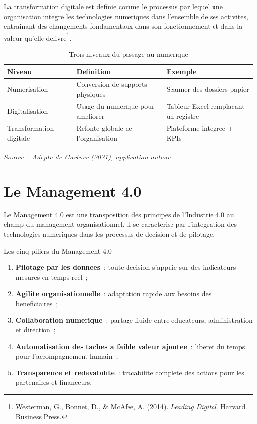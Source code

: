 \documentclass[12pt,a4paper,openany]{report}
\begin{document}
La transformation digitale est definie comme le processus par lequel
une organisation integre les technologies numeriques dans l'ensemble
de ses activites, entrainant des changements fondamentaux dans son
fonctionnement et dans la valeur qu'elle delivre\footnote{Westerman,
G., Bonnet, D., \& McAfee, A. (2014). \textit{Leading Digital}.
Harvard Business Press.}.

\begin{table}[H]
\centering
\caption{Trois niveaux du passage au numerique}
\label{tab:niveaux}
\begin{tabularx}{\textwidth}{lXX}
\toprule
\textbf{Niveau} & \textbf{Definition} & \textbf{Exemple}\\
\midrule
Numerisation & Conversion de supports physiques & Scanner des dossiers papier\\
Digitalisation & Usage du numerique pour ameliorer & Tableur Excel remplacant un registre\\
Transformation digitale & Refonte globale de l'organisation & Plateforme integree + KPIs\\
\bottomrule
\end{tabularx}
\vspace{0.1cm}
\small\textit{Source~: Adapte de Gartner (2021), application auteur.}
\end{table}

\section{Le Management 4.0}

Le Management 4.0 est une transposition des principes de l'Industrie 4.0
au champ du management organisationnel. Il se caracterise par l'integration
des technologies numeriques dans les processus de decision et de pilotage.

\begin{encadre}{Les cinq piliers du Management 4.0}
\begin{enumerate}
  \item \textbf{Pilotage par les donnees}~: toute decision s'appuie sur des
    indicateurs mesures en temps reel~;
  \item \textbf{Agilite organisationnelle}~: adaptation rapide aux besoins
    des beneficiaires~;
  \item \textbf{Collaboration numerique}~: partage fluide entre educateurs,
    administration et direction~;
  \item \textbf{Automatisation des taches a faible valeur ajoutee}~: liberer
    du temps pour l'accompagnement humain~;
  \item \textbf{Transparence et redevabilite}~: tracabilite complete des
    actions pour les partenaires et financeurs.
\end{enumerate}
\end{encadre}
\end{document}
